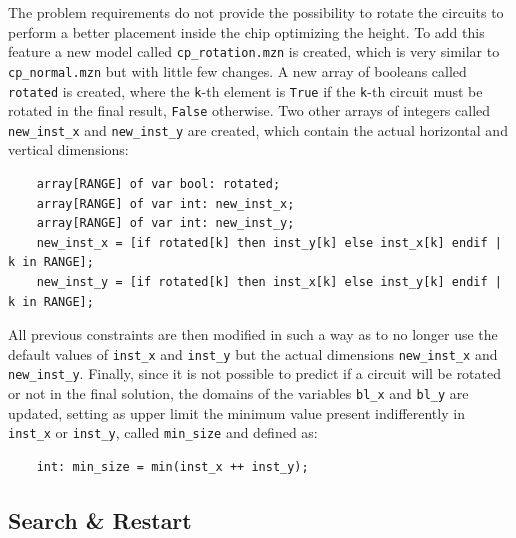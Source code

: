 \documentclass[a4paper, 12pt]{article}
\begin{document}
The problem requirements do not provide the possibility to rotate the circuits to perform a better placement inside the chip optimizing the height. To add this feature a new model called \verb|cp_rotation.mzn| is created, which is very similar to \verb|cp_normal.mzn| but with little few changes. A new array of booleans called \verb|rotated| is created, where the \verb|k|-th element is \verb|True| if the \verb|k|-th circuit must be rotated in the final result, \verb|False| otherwise. Two other arrays of integers called \verb|new_inst_x| and \verb|new_inst_y| are created, which contain the actual horizontal and vertical dimensions:
\begin{verbatim}
    array[RANGE] of var bool: rotated;
    array[RANGE] of var int: new_inst_x;
    array[RANGE] of var int: new_inst_y;
    new_inst_x = [if rotated[k] then inst_y[k] else inst_x[k] endif | k in RANGE];
    new_inst_y = [if rotated[k] then inst_x[k] else inst_y[k] endif | k in RANGE];
\end{verbatim}

All previous constraints are then modified in such a way as to no longer use the default values of \verb|inst_x| and \verb|inst_y| but the actual dimensions \verb|new_inst_x| and \verb|new_inst_y|. Finally, since it is not possible to predict if a circuit will be rotated or not in the final solution, the domains of the variables \verb|bl_x| and \verb|bl_y| are updated, setting as upper limit the minimum value present indifferently in \verb|inst_x| or \verb|inst_y|, called \verb|min_size| and defined as:
\begin{verbatim}
    int: min_size = min(inst_x ++ inst_y);
\end{verbatim}


\subsection{Search \& Restart}
\end{document}
